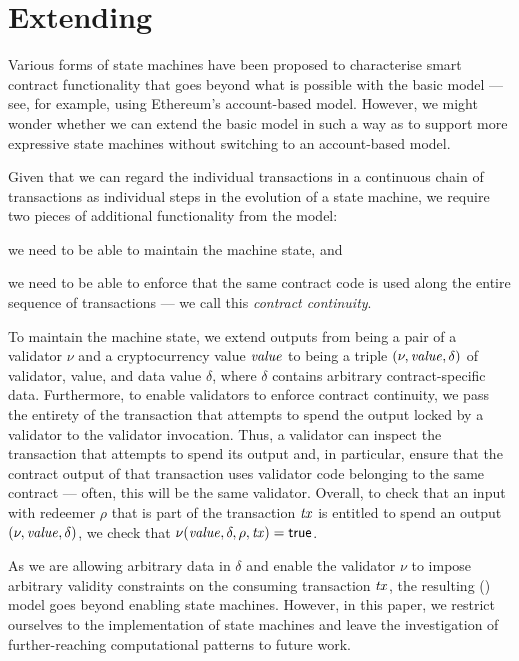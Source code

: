 \section{Extending \UTXO}
\label{sec:informal-eutxo}

Various forms of state machines have been proposed to characterise smart contract functionality that goes beyond what is possible with the basic \UTXO{} model --- see, for example, \cite{fsolidm,scilla} using Ethereum's account-based model. However, we might wonder whether we can extend the basic \UTXO{} model in such a way as to support more expressive state machines without switching to an account-based model. 

Given that we can regard the individual transactions in a continuous chain of transactions as individual steps in the evolution of a state machine, we require two pieces of additional functionality from the \UTXO{} model: 
\begin{inparaenum}[(a)]
\item we need to be able to maintain the machine state, and 
\item we need to be able to enforce that the same contract code is used along the entire sequence of transactions --- we call this \emph{contract continuity}.
\end{inparaenum}

To maintain the machine state, we extend \UTXO{} outputs from being a pair of a validator $\nu$ and a cryptocurrency value $\mathit{value}$ to being a triple \((\nu, \mathit{value}, \delta)\) of validator, value, and data value $\delta$, where $\delta$ contains arbitrary contract-specific data. Furthermore, to enable validators to enforce contract continuity, we pass the entirety of the transaction that attempts to spend the output locked by a validator to the validator invocation. Thus, a validator can inspect the transaction that attempts to spend its output and, in particular, ensure that the contract output of that transaction uses validator code belonging to the same contract --- often, this will be the same validator. Overall, to check that an input with redeemer $\rho$ that is part of the transaction $\mathit{tx}$ is entitled to spend an output \((\nu, \mathit{value}, \delta)\), we check that \(\nu(\mathit{value}, \delta, \rho, \mathit{tx}) = \textsf{true}\).

As we are allowing arbitrary data in $\delta$ and enable the validator $\nu$ to impose arbitrary validity constraints on the consuming transaction $\mathit{tx}$, the resulting \ExUTXO{} (\EUTXO{}) model goes beyond enabling state machines. However, in this paper, we restrict ourselves to the implementation of state machines and leave the investigation of further-reaching computational patterns to future work.

